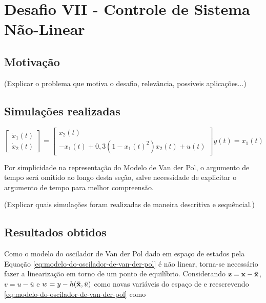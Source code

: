 \newcommand{\mat}[1]{\MakeUppercase{\mathbf{#1}}}
\newcommand{\ssvec}[1]{\MakeLowercase{\mathbf{#1}}}
\newcommand{\ssveceq}[1]{\MakeLowercase{\mathbf{\bar{#1}}}}

\section{Desafio VII - Controle de Sistema Não-Linear} 

\subsection{Motivação}
(Explicar o problema que motiva o desafio, relevância, possíveis aplicações...) 

\subsection{Simulações realizadas}

\begin{subequations}
    \label{eq:modelo-do-oscilador-de-van-der-pol}
    \begin{equation}
        \begin{bmatrix}
            \dot{x}_1(t) \\
            \dot{x}_2(t)
        \end{bmatrix}
        =
        \begin{bmatrix}
            x_2(t) \\
            -x_1(t) + 0,3(1 - x_1(t)^2)x_2(t) + u(t)
        \end{bmatrix}
    \end{equation}
    \begin{equation}
        y(t) = x_1(t)
    \end{equation}
\end{subequations}

Por simplicidade na representação do Modelo de Van der Pol, o argumento de tempo
será omitido ao longo desta seção, salve necessidade de explicitar o argumento
de tempo para melhor compreensão.

(Explicar quais simulações foram realizadas de maneira descritiva e sequêncial.) 

\subsection{Resultados obtidos}

Como o modelo do oscilador de Van der Pol dado em espaço de estados pela Equação
\ref{eq:modelo-do-oscilador-de-van-der-pol} é não linear, torna-se necessário
fazer a linearização em torno de um ponto de equilíbrio. Considerando $\ssvec{z}
= \ssvec{x} - \ssveceq{x}$, $v = u - \bar{u}$ e $w = y - h(\ssveceq{x},
\bar{u})$ como novas variáveis do espaço de e reescrevendo
\ref{eq:modelo-do-oscilador-de-van-der-pol} como 

